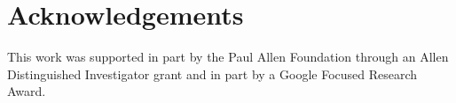 \documentclass{article}
\newcommand{\transp}{^{T}}
\begin{document}



\section*{Acknowledgements} 
This work was supported in part by the Paul
Allen Foundation through an Allen Distinguished
Investigator grant and in part by a Google Focused Research Award.









\clearpage





\end{document}
